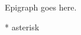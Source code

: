 
\section*{}
\hfill
\hfill
\begin{minipage}[c]{0.3\linewidth}
Epigraph goes here.
\end{minipage}
\hfill
\hfill

\bigskip

\bigskip

\bigskip

\bigskip

\hfill
\begin{minipage}[c]{0.3\linewidth}
* asterisk
\end{minipage}
\hfill
\hfill

